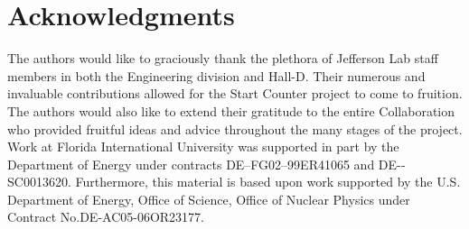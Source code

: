 \section{Acknowledgments}

The authors would like to graciously thank the plethora of Jefferson Lab staff members in both the Engineering division and Hall-D.  Their numerous and invaluable contributions allowed for the Start Counter project to come to fruition.  The authors would also like to extend their gratitude to the entire \gx{} Collaboration who provided fruitful ideas and advice throughout the many stages of the project.  Work at Florida International University was supported in part by the Department of Energy under contracts DE–FG02–99ER41065 and DE-­SC0013620. Furthermore, this material is based upon work supported by the U.S. Department of Energy, Office of Science, Office of Nuclear Physics under Contract No.DE-AC05-06OR23177. 